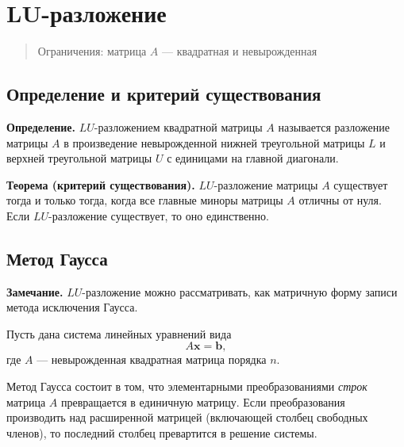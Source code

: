 \documentclass[11pt,a4paper]{article}
\begin{document}
    \hypertarget{mathbflu-ux440ux430ux437ux43bux43eux436ux435ux43dux438ux435}{%
\section{\texorpdfstring{\(\mathbf{LU}\)-разложение}{\textbackslash{}mathbf\{LU\}-разложение}}\label{mathbflu-ux440ux430ux437ux43bux43eux436ux435ux43dux438ux435}}

\begin{quote}
Ограничения: матрица \(A\) --- квадратная и невырожденная
\end{quote}

    \hypertarget{ux43eux43fux440ux435ux434ux435ux43bux435ux43dux438ux435-ux438-ux43aux440ux438ux442ux435ux440ux438ux439-ux441ux443ux449ux435ux441ux442ux432ux43eux432ux430ux43dux438ux44f}{%
\subsection{Определение и критерий
существования}\label{ux43eux43fux440ux435ux434ux435ux43bux435ux43dux438ux435-ux438-ux43aux440ux438ux442ux435ux440ux438ux439-ux441ux443ux449ux435ux441ux442ux432ux43eux432ux430ux43dux438ux44f}}

\textbf{Определение.} \(LU\)-разложением квадратной матрицы \(A\)
называется разложение матрицы \(A\) в произведение невырожденной нижней
треугольной матрицы \(L\) и верхней треугольной матрицы \(U\) с
единицами на главной диагонали.

\textbf{Теорема (критерий существования).} \(LU\)-разложение матрицы
\(A\) существует тогда и только тогда, когда все главные миноры матрицы
\(A\) отличны от нуля. Если \(LU\)-разложение существует, то оно
единственно.

    \hypertarget{ux43cux435ux442ux43eux434-ux433ux430ux443ux441ux441ux430}{%
\subsection{Метод
Гаусса}\label{ux43cux435ux442ux43eux434-ux433ux430ux443ux441ux441ux430}}

\textbf{Замечание.} \(LU\)-разложение можно рассматривать, как матричную
форму записи метода исключения Гаусса.

Пусть дана система линейных уравнений вида
\[ A \mathbf{x} = \mathbf{b}, \] где \(A\) --- невырожденная квадратная
матрица порядка \(n\).

Метод Гаусса состоит в том, что элементарными преобразованиями
\emph{строк} матрица \(A\) превращается в единичную матрицу. Если
преобразования производить над расширенной матрицей (включающей столбец
свободных членов), то последний столбец превартится в решение системы.
\end{document}

